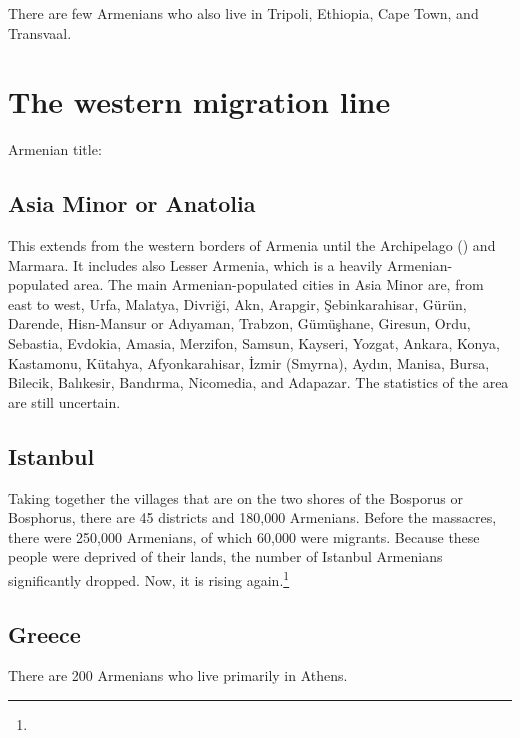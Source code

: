 There are few Armenians who also live in Tripoli, Ethiopia, Cape Town, and Transvaal. 


\begin{adjarianpage}\label{page:29}\end{adjarianpage}%


\section{The western migration line}

Armenian title: 

\subsection{Asia Minor or Anatolia}

This extends from the western borders of Armenia until the Archipelago () and Marmara. It includes also     Lesser Armenia, which is a heavily Armenian-populated area. The main Armenian-populated cities in Asia Minor are, from east to west, Urfa, Malatya, Divriği, Akn, Arapgir, Şebinkarahisar, Gürün, Darende, Hisn-Mansur or Adıyaman, Trabzon, Gümüşhane, Giresun, Ordu, Sebastia, Evdokia, Amasia, Merzifon, Samsun, Kayseri, Yozgat, Ankara, Konya, Kastamonu, Kütahya, Afyonkarahisar, İzmir (Smyrna), Aydın, Manisa, Bursa, Bilecik, Balıkesir, Bandırma, Nicomedia, and Adapazar. The statistics of the area are still uncertain.

\subsection{Istanbul}

Taking together the villages that are on the two shores of the Bosporus or Bosphorus, there are 45 districts and 180,000 Armenians. Before the massacres, there were 250,000 Armenians, of which 60,000 were migrants. Because these people were deprived of their lands, the number of Istanbul Armenians significantly dropped. Now, it is rising again.\footnote{}

\subsection{Greece}

There are 200 Armenians who live primarily in Athens.


